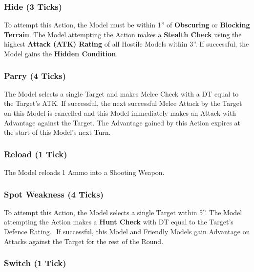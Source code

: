 \documentclass[
]{book}
\begin{document}
\hypertarget{hide-3-ticks}{%
\subsubsection*{Hide (3 Ticks)}\label{hide-3-ticks}}

To attempt this Action, the Model must be within 1'' of \textbf{Obscuring} or \textbf{Blocking Terrain}. The Model attempting the Action makes a \textbf{Stealth Check} using the highest \textbf{Attack (ATK) Rating} of all Hostile Models within 3''. If successful, the Model gains the \textbf{Hidden Condition}.

\hypertarget{parry-4-ticks}{%
\subsubsection*{Parry (4 Ticks)}\label{parry-4-ticks}}

The Model selects a single Target and makes Melee Check with a DT equal to the Target's ATK. If successful, the next successful Melee Attack by the Target on this Model is cancelled and this Model immediately makes an Attack with Advantage against the Target. The Advantage gained by this Action expires at the start of this Model's next Turn.

\hypertarget{reload-1-tick}{%
\subsubsection*{Reload (1 Tick)}\label{reload-1-tick}}

The Model reloads 1 Ammo into a Shooting Weapon.

\hypertarget{spot-weakness-4-ticks}{%
\subsubsection*{Spot Weakness (4 Ticks)}\label{spot-weakness-4-ticks}}

To attempt this Action, the Model selects a single Target within 5''. The Model attempting the Action makes a \textbf{Hunt Check} with DT equal to the Target's Defence Rating.  If successful, this Model and Friendly Models gain Advantage on Attacks against the Target for the rest of the Round.

\hypertarget{switch-1-tick}{%
\subsubsection*{Switch (1 Tick)}\label{switch-1-tick}}
\end{document}
